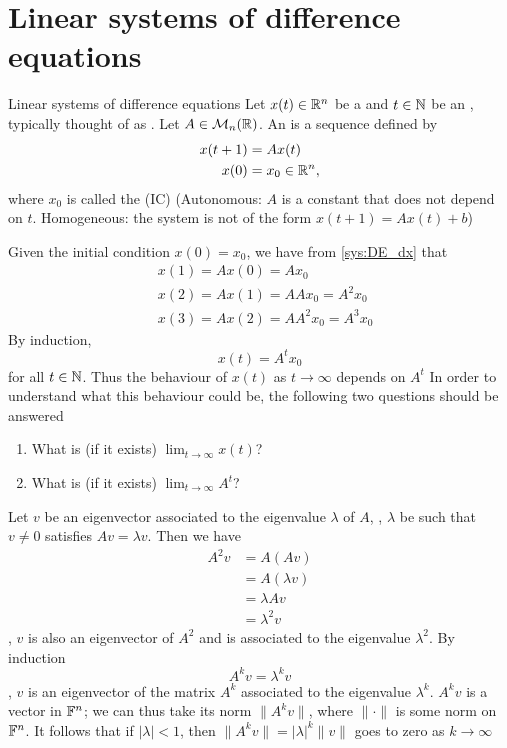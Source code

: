 \documentclass[aspectratio=169]{beamer}
\begin{document}
\section{Linear systems of difference equations}
\label{sec:linear_DE}
\begin{frame}{Linear systems of difference equations}
Let $x(t)\in \mathbb{R}^n$ be a  and $t\in \mathbb{N}$ be an , typically thought of as . Let $A\in \mathcal{M}_n(\mathbb{R})$. 
An  is a sequence defined by
\begin{subequations}\label{sys:DE}
\begin{align}
x(t+1) &= Ax(t) \label{sys:DE_dx}\\
x(0) &=x_0\in \mathbb{R}^n, \label{sys:DE_IC}
\end{align}	
\end{subequations}
where $x_0$ is called the  (IC)
\vfill
(Autonomous: $A$ is a constant that does not depend on $t$. Homogeneous: the system is not of the form $x(t+1)=Ax(t)+b$)
\end{frame}

\begin{frame}
Given the initial condition $x(0)=x_0$, we have from \eqref{sys:DE_dx} that
\begin{align*}
 &x(1)= Ax(0)=Ax_0\\
 & x(2)= Ax(1)= AAx_0=A^2x_0 \\
 &x(3)=Ax(2)=AA^2x_0=A^3x_0
\end{align*}
\vfill
By induction,
\[
x(t)=A^tx_0
\] 
for all $t\in\mathbb{N}$.
Thus the behaviour of $x(t)$ as $t\to\infty$ depends on $A^t$
\vfill
In order to understand what this behaviour could be, the following two questions should be answered
\begin{enumerate}
	\item What is (if it exists) $\lim_{t\to \infty} x(t)$? 
	\item What is (if it exists) $\lim_{t \to \infty} A^t$? 
\end{enumerate}
\end{frame}

\begin{frame}
Let $v$ be an eigenvector associated to the eigenvalue $\lambda$ of $A$, \ie, $\lambda$ be such that $v\neq 0$ satisfies $Av=\lambda v$. Then we have
 \begin{align*}
 A^2v &= A(Av) \\
 &=A(\lambda v) \\
 &=\lambda Av \\
 &=\lambda^2 v
 \end{align*}
\ie, $v$ is also an eigenvector of $A^2$ and is associated to the eigenvalue $\lambda^2$.
By induction
\[
A^kv=\lambda^k v
\]
\ie, $v$ is an eigenvector of the matrix $A^k$ associated to the eigenvalue $\lambda^k$. $A^kv$ is a vector in $\mathbb{F}^n$; we can thus take its norm $\|A^kv\|$, where $\|\cdot\|$ is some norm on $\mathbb{F}^n$. It follows that if $|\lambda|<1$, then $\|A^kv\|=|\lambda|^k\|v\|$ goes to zero as $k\to\infty$
\end{frame}
\end{document}

